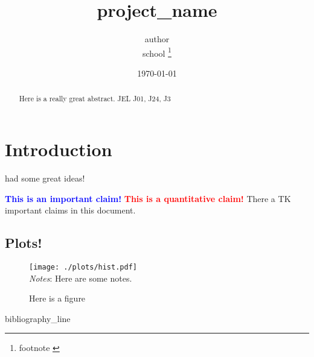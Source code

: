 \documentclass[11pt]{article}
\newcommand{\important}[1]{\textcolor{blue}{\textbf{ #1}}}
\newcommand{\quantclaim}[1]{\textcolor{red}{\textbf{ #1}}}
\begin{document}
 

\title{ {{project_name}} }

\date{\today}

\author{ {{ author }} \\ {{ school }} \footnote{ {{ footnote }} } }
\maketitle

\begin{abstract}
\noindent  Here is a really great abstract.  \newline
\noindent JEL J01, J24, J3
\end{abstract} 

\section{Introduction}
\cite{smith1999wealth} had some great ideas! 

\important{This is an important claim!}
\quantclaim{This is a quantitative claim!} 
There a TK important claims in this document. 

\subsection{Plots!}

\begin{figure}[h]
\centering 
\caption{Here is a figure} \label{fig:hist}
\begin{minipage}{0.50 \linewidth}
\texttt{[image: ./plots/hist.pdf]}
\\
\emph{Notes}: Here are some notes.
\end{minipage} 
\end{figure}




{{ bibliography_line }}
\end{document}
